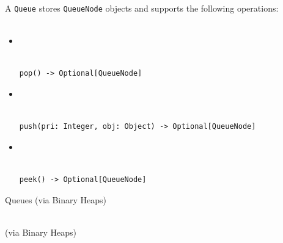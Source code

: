 \documentclass[mathserif, handout]{beamer}
\begin{document}
\begin{frame}[fragile]
A \texttt{Queue} stores \texttt{QueueNode} objects and supports the following operations:\\~\\
\begin{itemize}


\item {} \\
\\[-1mm]
\begin{lstlisting}[style=mypython]
pop() -> Optional[QueueNode]
\end{lstlisting}


\item {} \\
\\[-1mm]
\begin{lstlisting}[style=mypython]
push(pri: Integer, obj: Object) -> Optional[QueueNode]
\end{lstlisting}

\item {} \\
\\[-1mm]
\begin{lstlisting}[style=mypython]
peek() -> Optional[QueueNode]
\end{lstlisting}

\end{itemize}
\end{frame}

\begin{frame}{Queues (via Binary Heaps)}
\begin{center}
\Large {} \\[1mm] \normalsize \color{gray} (via Binary Heaps)
\end{center}
\end{frame}
\end{document}
